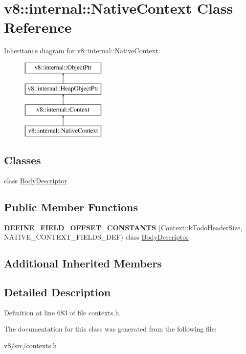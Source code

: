 \hypertarget{classv8_1_1internal_1_1NativeContext}{}\section{v8\+:\+:internal\+:\+:Native\+Context Class Reference}
\label{classv8_1_1internal_1_1NativeContext}
Inheritance diagram for v8\+:\+:internal\+:\+:Native\+Context\+:\begin{figure}[H]
\begin{center}
\leavevmode
\includegraphics[height=4.000000cm]{classv8_1_1internal_1_1NativeContext}
\end{center}
\end{figure}
\subsection*{Classes}
\begin{DoxyCompactItemize}
\item 
class \mbox{\hyperlink{classv8_1_1internal_1_1NativeContext_1_1BodyDescriptor}{Body\+Descriptor}}
\end{DoxyCompactItemize}
\subsection*{Public Member Functions}
\begin{DoxyCompactItemize}
\item 
\mbox{\label{classv8_1_1internal_1_1NativeContext_a4c7e327538f1a77f23099e56eed9ca6a}} 
{\bfseries D\+E\+F\+I\+N\+E\+\_\+\+F\+I\+E\+L\+D\+\_\+\+O\+F\+F\+S\+E\+T\+\_\+\+C\+O\+N\+S\+T\+A\+N\+TS} (Context\+::k\+Todo\+Header\+Size, N\+A\+T\+I\+V\+E\+\_\+\+C\+O\+N\+T\+E\+X\+T\+\_\+\+F\+I\+E\+L\+D\+S\+\_\+\+D\+EF) class \mbox{\hyperlink{classv8_1_1internal_1_1NativeContext_1_1BodyDescriptor}{Body\+Descriptor}}
\end{DoxyCompactItemize}
\subsection*{Additional Inherited Members}


\subsection{Detailed Description}


Definition at line 683 of file contexts.\+h.



The documentation for this class was generated from the following file\+:\begin{DoxyCompactItemize}
\item 
v8/src/contexts.\+h\end{DoxyCompactItemize}
